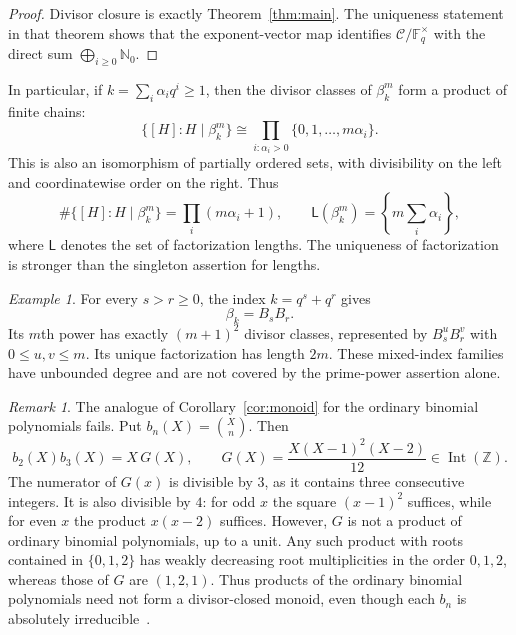\documentclass[11pt]{article}
\theoremstyle{remark}
\newtheorem{remark}[theorem]{Remark}
\newtheorem{example}[theorem]{Example}
\newcommand{\Int}{\operatorname{Int}}
\newcommand{\F}{\mathbb F}
\newcommand{\Nzero}{\mathbb N_0}
\begin{document}
\begin{proof}
Divisor closure is exactly Theorem~\ref{thm:main}. The uniqueness statement in that theorem shows that the exponent-vector map identifies $\mathcal C/\F_q^\times$ with the direct sum $\bigoplus_{i\geq0}\Nzero$.
\end{proof}

In particular, if $k=\sum_i\alpha_iq^i\geq1$, then the divisor classes of $\beta_k^m$ form a product of finite chains:
\[
 \{[H]:H\mid\beta_k^m\}
 \cong\prod_{i:\alpha_i>0}\{0,1,\ldots,m\alpha_i\}.
\]
This is also an isomorphism of partially ordered sets, with divisibility on the left and coordinatewise order on the right. Thus
\[
 \#\{[H]:H\mid\beta_k^m\}=\prod_i(m\alpha_i+1),
 \qquad
 \mathsf L(\beta_k^m)=\left\{m\sum_i\alpha_i\right\},
\]
where $\mathsf L$ denotes the set of factorization lengths. The uniqueness of factorization is stronger than the singleton assertion for lengths.

\begin{example}
For every $s>r\geq0$, the index $k=q^s+q^r$ gives
\[
 \beta_k=B_sB_r.
\]
Its $m$th power has exactly $(m+1)^2$ divisor classes, represented by $B_s^uB_r^v$ with $0\leq u,v\leq m$. Its unique factorization has length $2m$. These mixed-index families have unbounded degree and are not covered by the prime-power assertion alone.
\end{example}

\begin{remark}
The analogue of Corollary~\ref{cor:monoid} for the ordinary binomial polynomials fails. Put $b_n(X)=\binom Xn$. Then
\[
 b_2(X)b_3(X)=X\,G(X),\qquad
 G(X)=\frac{X(X-1)^2(X-2)}{12}\in\Int(\mathbb Z).
\]
The numerator of $G(x)$ is divisible by $3$, as it contains three consecutive integers. It is also divisible by $4$: for odd $x$ the square $(x-1)^2$ suffices, while for even $x$ the product $x(x-2)$ suffices. However, $G$ is not a product of ordinary binomial polynomials, up to a unit. Any such product with roots contained in $\{0,1,2\}$ has weakly decreasing root multiplicities in the order $0,1,2$, whereas those of $G$ are $(1,2,1)$. Thus products of the ordinary binomial polynomials need not form a divisor-closed monoid, even though each $b_n$ is absolutely irreducible~\cite{RW}.
\end{remark}
\end{document}
